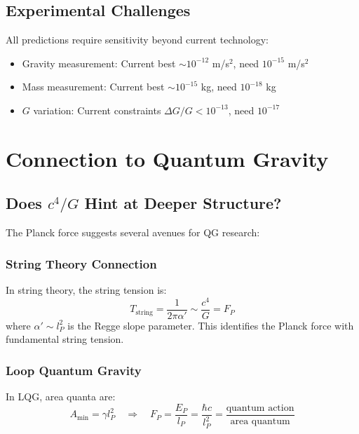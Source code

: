 \subsection{Experimental Challenges}

All predictions require sensitivity beyond current technology:
\begin{itemize}
\item Gravity measurement: Current best $\sim 10^{-12}$ m/s$^2$, need $10^{-15}$ m/s$^2$
\item Mass measurement: Current best $\sim 10^{-15}$ kg, need $10^{-18}$ kg
\item $G$ variation: Current constraints $\Delta G/G < 10^{-13}$, need $10^{-17}$
\end{itemize}

\section{Connection to Quantum Gravity}

\subsection{Does $c^4/G$ Hint at Deeper Structure?}

The Planck force suggests several avenues for QG research:

\subsubsection{String Theory Connection}

In string theory, the string tension is:
\begin{equation}
T_{\text{string}} = \frac{1}{2\pi\alpha'} \sim \frac{c^4}{G} = F_P
\end{equation}
where $\alpha' \sim l_P^2$ is the Regge slope parameter. This identifies the Planck force with fundamental string tension.

\subsubsection{Loop Quantum Gravity}

In LQG, area quanta are:
\begin{equation}
A_{\text{min}} = \gamma l_P^2 \quad \Rightarrow \quad F_P = \frac{E_P}{l_P} = \frac{\hbar c}{l_P^2} = \frac{\text{quantum action}}{\text{area quantum}}
\end{equation}

